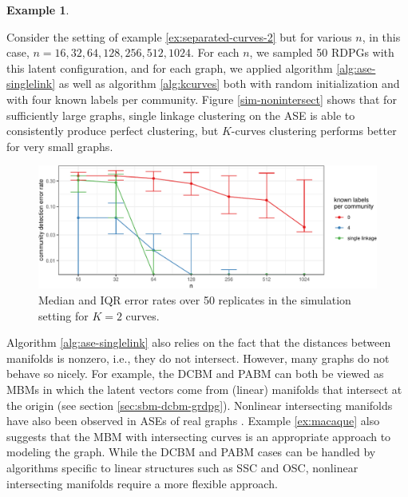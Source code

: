 \documentclass[
  12pt,
]{article}
\theoremstyle{definition}
\theoremstyle{definition}
\newtheorem{example}{Example}[section]
\theoremstyle{definition}
\theoremstyle{definition}
\theoremstyle{remark}
\begin{document}
\begin{example}
\label{ex:sim-nonintersect}

Consider the setting of example \ref{ex:separated-curves-2} but for various $n$, in this case, $n = 16, 32, 64, 128, 256, 512, 1024$. 
For each $n$, we sampled 50 RDPGs with this latent configuration, and for each graph, we applied algorithm \ref{alg:ase-singlelink} as well as algorithm \ref{alg:kcurves} both with random initialization and with four known labels per community. 
Figure \ref{sim-nonintersect} shows that for sufficiently large graphs, single linkage clustering on the ASE is able to consistently produce perfect clustering, but $K$-curves clustering performs better for very small graphs. 

\begin{figure}[H]

{\centering \includegraphics{draft_files/figure-latex/sim-nonintersect-1} 

}

\caption{Median and IQR error rates over 50 replicates in the simulation setting for $K = 2$ curves.}\label{fig:sim-nonintersect}
\end{figure}
\end{example}

Algorithm \ref{alg:ase-singlelink} also relies on the fact that the distances between manifolds is nonzero, i.e., they do not intersect.
However, many graphs do not behave so nicely.
For example, the DCBM and PABM can both be viewed as MBMs in which the latent vectors come from (linear) manifolds that intersect at the origin (see section \ref{sec:sbm-dcbm-grdpg}).
Nonlinear intersecting manifolds have also been observed in ASEs of real graphs \citep{SannaPassino2022, https://doi.org/10.48550/arxiv.1709.05454}.
Example \ref{ex:macaque} also suggests that the MBM with intersecting curves is an appropriate approach to modeling the graph.
While the DCBM and PABM cases can be handled by algorithms specific to linear structures such as SSC and OSC, nonlinear intersecting manifolds require a more flexible approach.
\end{document}
